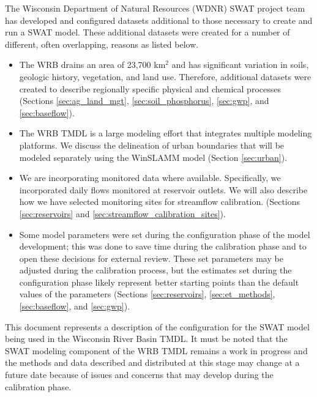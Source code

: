 The Wisconsin Department of Natural Resources (WDNR) SWAT project team has developed and configured datasets additional to those necessary to create and run a SWAT model. These additional datasets were created for a number of different, often overlapping, reasons as listed below. 
\begin{itemize}
\item The WRB drains an area of 23,700 km$^2$ and has significant variation in soils, geologic history, vegetation, and land use. Therefore, additional datasets were created to describe regionally specific physical and chemical processes (Sections \ref{sec:ag_land_mgt}, \ref{sec:soil_phosphorus}, \ref{sec:gwp}, and \ref{sec:baseflow}).

\item The WRB TMDL is a large modeling effort that integrates multiple modeling platforms. We discuss the delineation of urban boundaries that will be modeled separately using the WinSLAMM model (Section \ref{sec:urban}).

\item We are incorporating monitored data where available. Specifically, we incorporated daily flows monitored at reservoir outlets.
We will also describe how we have selected monitoring sites for streamflow calibration. (Sections \ref{sec:reservoirs} and \ref{sec:streamflow_calibration_sites}).
 
\item Some model parameters were set during the configuration phase of the model development; 
this was done to save time during the calibration phase and to open these decisions for external review. 
These set parameters may be adjusted during the calibration process, but the estimates set during the configuration phase likely represent better starting points than the default values of the parameters (Sections \ref{sec:reservoirs}, \ref{sec:et_methods}, \ref{sec:baseflow}, and \ref{sec:gwp}).
\end{itemize}

This document represents a description of the configuration for the SWAT model being used in the Wisconsin River Basin TMDL. 
It must be noted that the SWAT modeling component of the WRB TMDL remains a work in progress and the methods and data described and distributed at this stage may change at a future date because of issues and concerns that may develop during the calibration phase.



